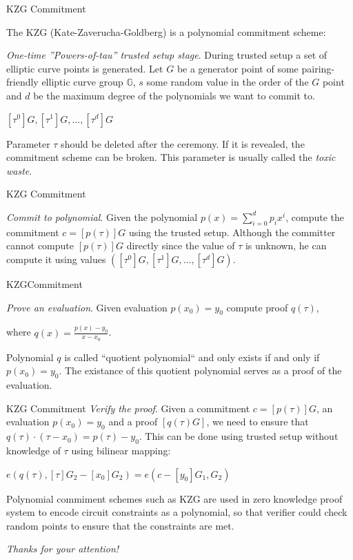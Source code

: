 \documentclass[xcolor={usenames,dvipsnames}]{beamer}
\begin{document}
    \begin{frame}{KZG Commitment}
    
    The KZG (Kate-Zaverucha-Goldberg) is a polynomial commitment scheme:

        \textit{One-time ''Powers-of-tau'' trusted setup stage}. During trusted setup a set of elliptic curve points is generated. Let $G$ be a generator point of some pairing-friendly
        elliptic curve group $\mathbb{G}$, $s$ some random value in the order of the $G$ point and $d$ be the maximum degree of the polynomials we want to commit to.

        \begin{center}
            $[\tau^0]G, [\tau^1]G, \ldots, [\tau^d]G$
        \end{center}

        Parameter $\tau$ should be deleted after the ceremony. If it is revealed, the commitment scheme can be broken. This parameter is usually called the \textit{toxic waste}.
    \end{frame}

    \begin{frame}{KZG Commitment}

        \textit{Commit to polynomial}. Given the polynomial $p(x) = \sum_{i = 0}^{d} p_i x^i$, compute the commitment $c = [p(\tau)]G $ 
        using the trusted setup. Although the committer cannot compute $[p(\tau)]G$ directly since the value of $\tau$ is unknown, he can
        compute it using values $([\tau^0]G, [\tau^1]G, \ldots, [\tau^d]G)$.
    \end{frame}
    
    \begin{frame}{KZGCommitment}
    
        \textit{Prove an evaluation}. Given evaluation $p(x_0) = y_0$ compute proof $q(\tau)$,
    
        where $q(x) = \frac{p(x) - y_0}{x - x_0}$.

        Polynomial $q$ is called ``quotient polynomial`` and only exists if and only if $p(x_0) = y_0$. The existance of this quotient polynomial serves
        as a proof of the evaluation.
    \end{frame}

    \begin{frame}{KZG Commitment}
        \textit{Verify the proof}. Given a commitment $c = [p(\tau)]G$, an evaluation $p(x_0) = y_0$ and a proof $[q(\tau)G]$, we need to
        ensure that $q(\tau) \cdot (\tau - x_0) = p(\tau) - y_0$. This can be done using trusted setup without knowledge of $\tau$ using bilinear mapping:

        \begin{center}
            $e(q(\tau), [\tau]G_2 - [x_0]G_2) = e(c - [y_0]G_1, G_2)$
        \end{center}
        
        Polynomial commiment schemes such as KZG are used in zero knowledge proof system to encode circuit constraints as a polynomial, 
        so that verifier could check random points to ensure that the constraints are met.
    \end{frame}

    


    
	\begin{frame}{}
      \centering \Large
      \emph{Thanks for your attention!}
    \end{frame}
\end{document}
